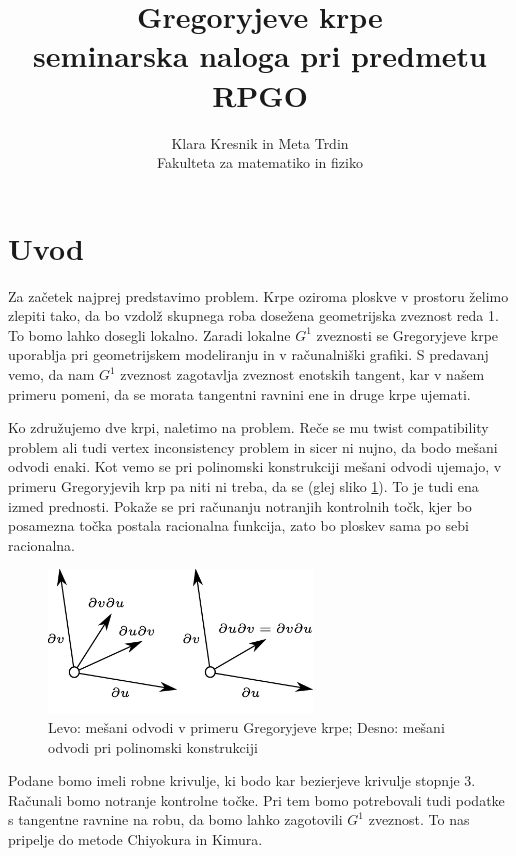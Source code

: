\documentclass[a4paper,12pt]{article}
\title{Gregoryjeve krpe\\
\Large seminarska naloga pri predmetu RPGO}
\date{}
\author{Klara Kresnik in Meta Trdin\\
Fakulteta za matematiko in fiziko\\
}
\begin{document}
\maketitle
\pagebreak



\section{Uvod}
Za začetek najprej predstavimo problem. Krpe oziroma ploskve v prostoru želimo zlepiti tako, da bo vzdolž skupnega roba dosežena geometrijska zveznost reda 1. To bomo lahko dosegli lokalno. Zaradi lokalne $G^1$ zveznosti se Gregoryjeve krpe uporablja pri geometrijskem modeliranju in v računalniški grafiki. S predavanj vemo, da nam $G^1$ zveznost zagotavlja zveznost enotskih tangent, kar v našem primeru pomeni, da se morata tangentni ravnini ene in druge krpe ujemati.

Ko združujemo dve krpi, naletimo na problem. Reče se mu twist compatibility problem ali tudi vertex inconsistency problem in sicer ni nujno, da bodo mešani odvodi enaki.
Kot vemo se pri polinomski konstrukciji mešani odvodi ujemajo, v primeru Gregoryjevih krp pa niti ni treba, da se (glej sliko \ref{fig:mesani odvodi}). To je tudi ena izmed prednosti. Pokaže se pri računanju notranjih kontrolnih točk, kjer bo posamezna točka postala racionalna funkcija, zato bo ploskev sama po sebi racionalna.

\begin{figure}[h]
	\centering
	\includegraphics[width=7cm]{mesani_odvodi_ob.jpg}
	\caption{Levo: mešani odvodi v primeru Gregoryjeve krpe; Desno: mešani odvodi pri polinomski konstrukciji}
	\label{fig:mesani odvodi}
\end{figure}

Podane bomo imeli robne krivulje, ki bodo kar bezierjeve krivulje stopnje $3$. Računali 
bomo notranje kontrolne točke. Pri tem bomo potrebovali tudi podatke s tangentne ravnine 
na robu, da bomo lahko zagotovili $G^1$ zveznost. To nas pripelje do metode Chiyokura in 
Kimura. 
\end{document}
